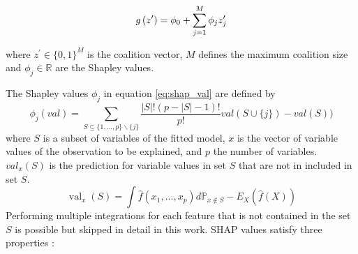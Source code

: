 \documentclass[12pt,a4paper]{article}
\begin{document}
\begin{equation}
g\left(z^{\prime}\right)=\phi_{0}+\sum_{j=1}^{M} \phi_{j} z_{j}^{\prime} \\
\label{eq:shap_val}
\end{equation}

where \(z^{\prime} \in \{0,1\}^M\) is the coalition vector, \(M\) defines the maximum coalition size and \(\phi_j \in \mathbb{R}\) are the Shapley values.

The Shapley values \(\phi_j\) in equation \ref{eq:shap_val} are defined by
\begin{equation}
\phi_{j}(val)=\sum_{S \subseteq\{1, \ldots, p\}\backslash \{j\}} \frac{|S| !(p-|S|-1) !}{p !}val(S \cup\{j\})-val(S))
\end{equation}
where \(S\) is a subset of variables of the fitted model, \(x\) is the vector of variable values of the observation to be explained, and \(p\) the number of variables. \(val_x(S)\) is the prediction for variable values in set \(S\) that are not in included in set \(S\).
\begin{equation}
\operatorname{val}_{x}(S)=\int \hat{f}\left(x_{1}, \ldots, x_{p}\right) d \mathbb{P}_{x \notin S}-E_{X}(\hat{f}(X))
\end{equation}
Performing multiple integrations for each feature that is not contained in the set \(S\) is possible but skipped in detail in this work. SHAP values satisfy three properties :
\end{document}
